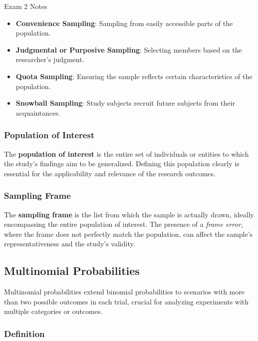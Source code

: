 \begin{examnotes}{Exam 2 Notes}
    \begin{itemize}
        \item \textbf{Convenience Sampling}: Sampling from easily accessible parts of the population.
        \item \textbf{Judgmental or Purposive Sampling}: Selecting members based on the researcher's judgment.
        \item \textbf{Quota Sampling}: Ensuring the sample reflects certain characteristics of the population.
        \item \textbf{Snowball Sampling}: Study subjects recruit future subjects from their acquaintances.
    \end{itemize}
    
    \subsubsection*{Population of Interest}
    
    The \textbf{population of interest} is the entire set of individuals or entities to which the study's findings aim to be generalized. Defining this population clearly is essential for the applicability 
    and relevance of the research outcomes.
    
    \subsubsection*{Sampling Frame}
    
    The \textbf{sampling frame} is the list from which the sample is actually drawn, ideally encompassing the entire population of interest. The presence of a \textit{frame error}, where the frame 
    does not perfectly match the population, can affect the sample's representativeness and the study's validity.

    \subsection*{Multinomial Probabilities}

    Multinomial probabilities extend binomial probabilities to scenarios with more than two possible outcomes in each trial, crucial for analyzing experiments with multiple categories or outcomes.
    
    \subsubsection*{Definition}
    

\end{examnotes}
